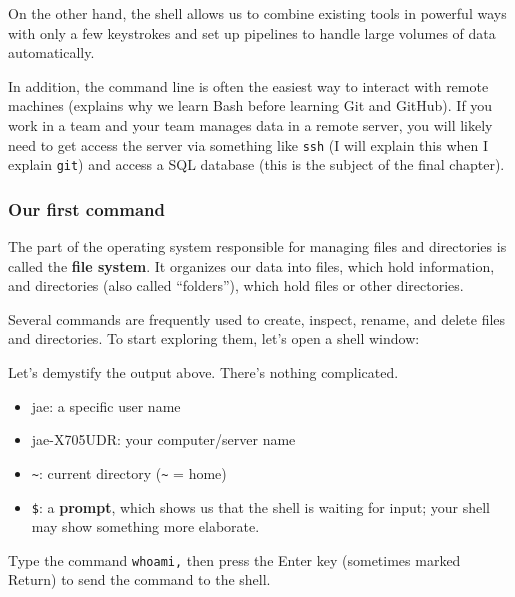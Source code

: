 \documentclass[
]{book}
\newenvironment{Shaded}{\begin{snugshade}}{\end{snugshade}}
\newcommand{\ExtensionTok}[1]{#1}
\providecommand{\tightlist}{%
  \setlength{\itemsep}{0pt}\setlength{\parskip}{0pt}}
\begin{document}
On the other hand, the shell allows us to combine existing tools in powerful ways with only a few keystrokes and set up pipelines to handle large volumes of data automatically.

In addition, the command line is often the easiest way to interact with remote machines (explains why we learn Bash before learning Git and GitHub). If you work in a team and your team manages data in a remote server, you will likely need to get access the server via something like \texttt{ssh} (I will explain this when I explain \texttt{git}) and access a SQL database (this is the subject of the final chapter).

\hypertarget{our-first-command}{%
\subsubsection{Our first command}\label{our-first-command}}

The part of the operating system responsible for managing files and directories is called the \textbf{file system}. It organizes our data into files, which hold information, and directories (also called ``folders''), which hold files or other directories.

Several commands are frequently used to create, inspect, rename, and delete files and directories. To start exploring them, let's open a shell window:

\begin{Shaded}
\end{Shaded}

Let's demystify the output above. There's nothing complicated.

\begin{itemize}
\tightlist
\item
  jae: a specific user name
\item
  jae-X705UDR: your computer/server name
\item
  \texttt{\textasciitilde{}}: current directory (\texttt{\textasciitilde{}} = home)
\item
  \texttt{\$}: a \textbf{prompt}, which shows us that the shell is waiting for input; your shell may show something more elaborate.
\end{itemize}

Type the command \texttt{whoami,} then press the Enter key (sometimes marked Return) to send the command to the shell.
\end{document}
